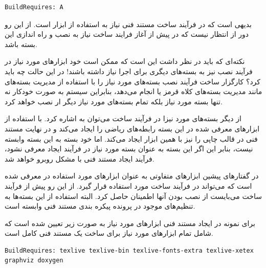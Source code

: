\begin{latin}
\lstset{language=C++}
\begin{lstlisting}[frame=single]
BuildRequires: A
\end{lstlisting}
\end{latin}

بدیهی است که در فرآیند ساخت مستند فنی نیاز به استفاده از ابزار  است.
از این رو دور از انتظار نیست که در پیش از آغاز فرایند ساخت نیاز به نصب و راه
اندازی این بسته باشد.

نکته‌ای که باید در نظر داشت این است که ممکن است خود ابزارهای مورد نیاز در فرآیند
نصب نیز به بسته‌های دیگری برای اجرا نیاز داشته باشند! در این حالت چه باید کرد؟
کارگزار ساخت فرآیند نصب بسته‌های مورد نیاز را با استفاده از مدیریت بسته‌های
مانند مدیریت بسته‌های کلاه قرمز یا  انجام می‌دهد، بنابراین سیستم به صورت
خودکار نه تنها بسته مورد نیاز بلکه تمام بسته‌های مورد نیاز دیگر ار نصب خواهد
کرد.

از دیگر بسته‌های مورد نیزا در فرآیند ساخت می‌توان به  اشاره کرد.
 با استفاده از ابزارهای معرفی شده در این بسته رابطه‌های ریاضی را
ایجاد می‌کند و در نهایت مستند فنی در قالب چاپی را نیز با همین ابزار ایجاد
می‌کند. اما خود بسته  به این بسته وابسته نیست، بنابر این اگر این
بسته به عنوان بسته مورد نیاز در فرآیند ایجاد معرفی نشود، فرآیند ایجاد مستند فنی
با مشکل روبرو خواهد شد.

در گفتارهای پیشین ابزارهای متفاوتی به عنوان ابزارهای مورد استفاده در
 معرفی شده است که می‌تواند در فرآیند ساخت مورد استفاده قرار گیرد. از
این رو پیش از فرآیند ساخت می‌بایست از نصب بودن آنها اطمینان حاصل کرد. البته
استفاده از این بسته‌ها به تنظیم‌های موجود در پرونده پیکره بندی مستند فنی
وابسته‌ است.

برای نمونه در ایجاد مستند فنی  ابزارهای مورد نیاز به صورت زیر تعیین
شده است که شامل تمام ابزارهای مورد نیاز برای ساخت یک مستند فنی کامل است.



\begin{latin}
\lstset{language=C++}
\begin{lstlisting}[frame=single]
BuildRequires: texlive texlive-bin texlive-fonts-extra texlive-xetex 
graphviz doxygen
\end{lstlisting}
\end{latin}

